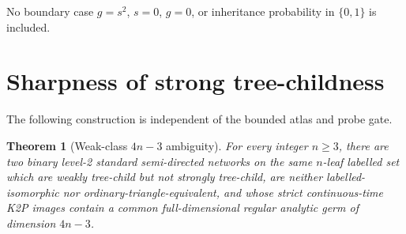 \documentclass[11pt]{article}
\newtheorem{theorem}{Theorem}[section]
\theoremstyle{remark}
\newcommand{\1}{\mathbf 1}
\begin{document}
No boundary case \(g=s^2\), \(s=0\), \(g=0\), or inheritance probability in
\(\{0,1\}\) is included.

\section{Sharpness of strong tree-childness}\label{sec:sharpness}

The following construction is independent of the bounded atlas and probe
gate.

\begin{theorem}[Weak-class \(4n-3\) ambiguity]\label{thm:sharpness}
For every integer \(n\ge3\), there are two binary level-2 standard
semi-directed networks on the same \(n\)-leaf labelled set which are weakly
tree-child but not strongly tree-child, are neither labelled-isomorphic nor
ordinary-triangle-equivalent, and whose strict continuous-time K2P images
contain a common full-dimensional regular analytic germ of dimension
\(4n-3\).
\end{theorem}
\end{document}
